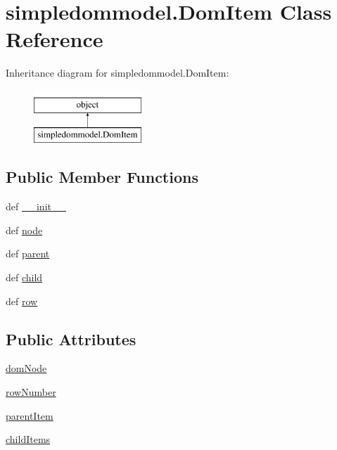 \hypertarget{classsimpledommodel_1_1DomItem}{}\section{simpledommodel.\+Dom\+Item Class Reference}
\label{classsimpledommodel_1_1DomItem}
Inheritance diagram for simpledommodel.\+Dom\+Item\+:\begin{figure}[H]
\begin{center}
\leavevmode
\includegraphics[height=2.000000cm]{classsimpledommodel_1_1DomItem}
\end{center}
\end{figure}
\subsection*{Public Member Functions}
\begin{DoxyCompactItemize}
\item 
def \hyperlink{classsimpledommodel_1_1DomItem_a69e604b65cb26a48862c5f8c3c82074c}{\+\_\+\+\_\+init\+\_\+\+\_\+}
\item 
def \hyperlink{classsimpledommodel_1_1DomItem_a24cfcc436864b50faf06b5a3b4eff71f}{node}
\item 
def \hyperlink{classsimpledommodel_1_1DomItem_a0ba534da41605040c71149a9184dda65}{parent}
\item 
def \hyperlink{classsimpledommodel_1_1DomItem_a15985f19fa94d9c380d6ddd56c730ce7}{child}
\item 
def \hyperlink{classsimpledommodel_1_1DomItem_a0b3fd9b3aae862575711e29c675468e3}{row}
\end{DoxyCompactItemize}
\subsection*{Public Attributes}
\begin{DoxyCompactItemize}
\item 
\hyperlink{classsimpledommodel_1_1DomItem_aca0e7a0395d8e737cd50673ee02366bc}{dom\+Node}
\item 
\hyperlink{classsimpledommodel_1_1DomItem_ab0ca2a5683be05b5bc1871e88e3cbeef}{row\+Number}
\item 
\hyperlink{classsimpledommodel_1_1DomItem_a2a0110c583f4ba8061391b88c872c927}{parent\+Item}
\item 
\hyperlink{classsimpledommodel_1_1DomItem_a249e6fab9926f4db066ede9acc2c6974}{child\+Items}
\end{DoxyCompactItemize}


